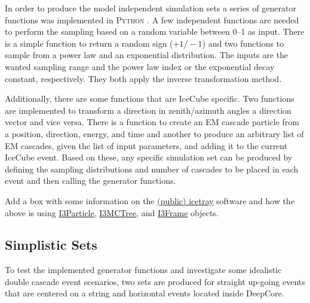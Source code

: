 In order to produce the model independent simulation sets a series of generator functions was implemented in \textsc{Python} .
A few independent functions are needed to perform the sampling based on a random variable between \SIrange[range-phrase={~and~}]{0}{1}{} as input. There is a simple function to return a random sign ($+1/-1$) and two functions to sample from a power law and an exponential distribution. The inputs are the wanted sampling range and the power law index or the exponential decay constant, respectively. They both apply the inverse transformation method.

Additionally, there are some functions that are IceCube specific. Two functions are implemented to transform a direction in zenith/azimuth angles a direction vector and vice versa. There is a function to create an EM cascade particle from a position, direction, energy, and time and another to produce an arbitrary list of EM cascades, given the list of input parameters, and adding it to the current IceCube event. Based on these, any specific simulation set can be produced by defining the sampling distributions and number of cascades to be placed in each event and then calling the generator functions.

  \begin{kaobox}[frametitle=IceCube software framework]
    Add a box with some information on the \href{https://github.com/icecube/icetray-public}{(public) icetray} software and how the above is using \href{https://docs.icecube.aq/icetray/main/projects/dataclasses/particle.html#i3particle}{I3Particle}, \href{https://docs.icecube.aq/icetray/main/projects/dataclasses/i3mctree.html#i3mctree}{I3MCTree}, and \href{https://docs.icecube.aq/icetray/main/projects/icetray/classes/i3frame.html#index-0}{I3Frame} objects.
  \end{kaobox}


\subsection{Simplistic Sets}

To test the implemented generator functions and investigate some idealistic double cascade event scenarios, two sets are produced for straight up-going events that are centered on a string and horizontal events located inside DeepCore.


